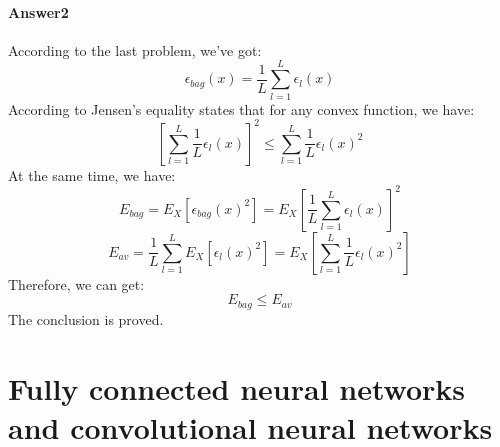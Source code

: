 \documentclass[paper=a4, fontsize=11pt]{scrartcl} %
\numberwithin{equation}{section} %
\numberwithin{figure}{section} %
\numberwithin{table}{section} %
\begin{document}
\paragraph{\textbf{Answer2}}
According to the last problem, we've got:
\begin{equation*}
\epsilon _{bag}\left ( x \right )=\frac{1}{L}\sum_{l=1}^{L}\epsilon _{l}\left ( x \right )
\end{equation*}
According to Jensen's equality states that for any convex function, we have:
\begin{equation*}
\left [ \sum_{l=1}^{L}\frac{1}{L}\epsilon _{l}\left ( x \right ) \right ]^{2}\leq \sum_{l=1}^{L}\frac{1}{L}\epsilon _{l}\left ( x \right )^{2}
\end{equation*}
At the same time, we have:
\begin{equation*}
E_{bag}=E_{X}\left [ \epsilon _{bag}\left ( x \right )^{2} \right ]=E_{X}\left [ \frac{1}{L}\sum_{l=1}^{L}\epsilon _{l}\left ( x \right ) \right ]^{2}
\end{equation*}
\begin{equation*}
E_{av}=\frac{1}{L}\sum_{l=1}^{L}E_{X}\left [ \epsilon _{l}\left ( x \right )^{2} \right ]=E_{X}\left [ \sum_{l=1}^{L}\frac{1}{L}\epsilon _{l}\left ( x \right )^{2} \right ]
\end{equation*}
Therefore, we can get:
\begin{equation*}
E_{bag} \leq E_{av}
\end{equation*}
The conclusion is proved.

\section{Fully connected neural networks and convolutional neural networks}
\end{document}

